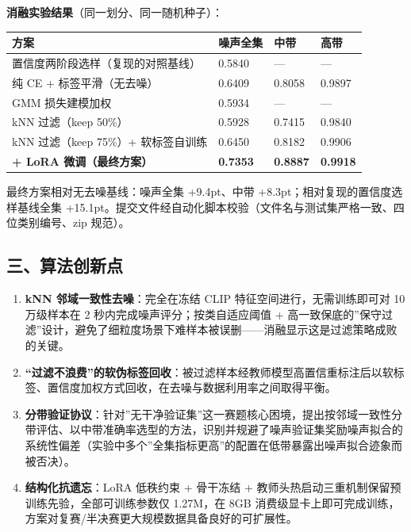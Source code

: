 \documentclass[
]{article}
\providecommand{\tightlist}{%
  \setlength{\itemsep}{0pt}\setlength{\parskip}{0pt}}
\begin{document}
\textbf{消融实验结果}（同一划分、同一随机种子）：

\begin{longtable}[]{@{}llll@{}}
\toprule\noalign{}
方案 & 噪声全集 & 中带 & 高带 \\
\midrule\noalign{}
\endhead
\bottomrule\noalign{}
\endlastfoot
置信度两阶段选样（复现的对照基线） & 0.5840 & --- & --- \\
纯 CE + 标签平滑（无去噪） & 0.6409 & 0.8058 & 0.9897 \\
GMM 损失建模加权 & 0.5934 & --- & --- \\
kNN 过滤（keep 50\%） & 0.5928 & 0.7415 & 0.9840 \\
kNN 过滤（keep 75\%）+ 软标签自训练 & 0.6450 & 0.8182 & 0.9906 \\
\textbf{+ LoRA 微调（最终方案）} & \textbf{0.7353} & \textbf{0.8887} &
\textbf{0.9918} \\
\end{longtable}

最终方案相对无去噪基线：噪声全集 +9.4pt、中带
+8.3pt；相对复现的置信度选样基线全集
+15.1pt。提交文件经自动化脚本校验（文件名与测试集严格一致、四位类别编号、zip
规范）。

\subsection{三、算法创新点}\label{ux4e09ux7b97ux6cd5ux521bux65b0ux70b9}

\begin{enumerate}
\def\labelenumi{\arabic{enumi}.}
\tightlist
\item
  \textbf{kNN 邻域一致性去噪}：完全在冻结 CLIP
  特征空间进行，无需训练即可对 10 万级样本在 2
  秒内完成噪声评分；按类自适应阈值 +
  高一致保底的''保守过滤''设计，避免了细粒度场景下难样本被误删------消融显示这是过滤策略成败的关键。
\item
  \textbf{``过滤不浪费''的软伪标签回收}：被过滤样本经教师模型高置信重标注后以软标签、置信度加权方式回收，在去噪与数据利用率之间取得平衡。
\item
  \textbf{分带验证协议}：针对''无干净验证集''这一赛题核心困境，提出按邻域一致性分带评估、以中带准确率选型的方法，识别并规避了噪声验证集奖励噪声拟合的系统性偏差（实验中多个''全集指标更高''的配置在低带暴露出噪声拟合迹象而被否决）。
\item
  \textbf{结构化抗遗忘}：LoRA 低秩约束 + 骨干冻结 +
  教师头热启动三重机制保留预训练先验，全部可训练参数仅 1.27M，在 8GB
  消费级显卡上即可完成训练，方案对复赛/半决赛更大规模数据具备良好的可扩展性。
\end{enumerate}
\end{document}
